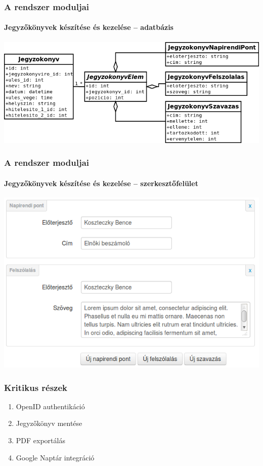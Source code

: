 \documentclass[12pt]{beamer}
\begin{document}
\begin{frame}
    \frametitle{A rendszer moduljai}
    \framesubtitle{Jegyzőkönyvek készítése és kezelése -- adatbázis}
    
    \includegraphics[width=\textwidth,center]{jegyzokonyv_db.png}
\end{frame}

\begin{frame}
    \frametitle{A rendszer moduljai}
    \framesubtitle{Jegyzőkönyvek készítése és kezelése -- szerkesztőfelület}
    
    \includegraphics[width=\textwidth,center]{jegyzokonyv-szerkesztes.png}
\end{frame}

\begin{frame}
    \frametitle{Kritikus részek}
    
    \Large
    \begin{enumerate}
        \item OpenID authentikáció
        \item Jegyzőkönyv mentése
        \item PDF exportálás
        \item Google Naptár integráció
    \end{enumerate}
\end{frame}
\end{document}
